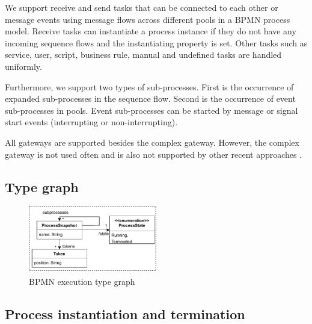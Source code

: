 \documentclass[adraft, copyright, creativecommons]{eptcs} %
\begin{document}
We support receive and send tasks that can be connected to each other or message events using message flows across different pools in a BPMN process model.
Receive tasks can instantiate a process instance if they do not have any incoming sequence flows and the \textsf{instantiating} property is set.
Other tasks such as service, user, script, business rule, manual and undefined tasks are handled uniformly.

Furthermore, we support two types of sub-processes.
First is the occurrence of expanded sub-processes in the sequence flow.
Second is the occurrence of event sub-processes in pools.
Event sub-processes can be started by message or signal start events (interrupting or non-interrupting).

All gateways are supported besides the complex gateway.
However, the complex gateway is not used often \cite{freundRealLifeBPMNUsing2019} and is also not supported by other recent approaches \cite{corradiniFormalApproachAnalysis2021, houhouFirstOrderLogicVerification2022, vangorpVisualTokenbasedFormalization2013}.

\subsection{Type graph}
\begin{figure}[h]
    \centering
    \includegraphics[width=0.5\textwidth]{images/bpmn_semantics-typegraph.pdf}
    \caption{BPMN execution type graph} %
    \label{fig:typeGraph}
\end{figure}

\subsection{Process instantiation and termination}
\end{document}
